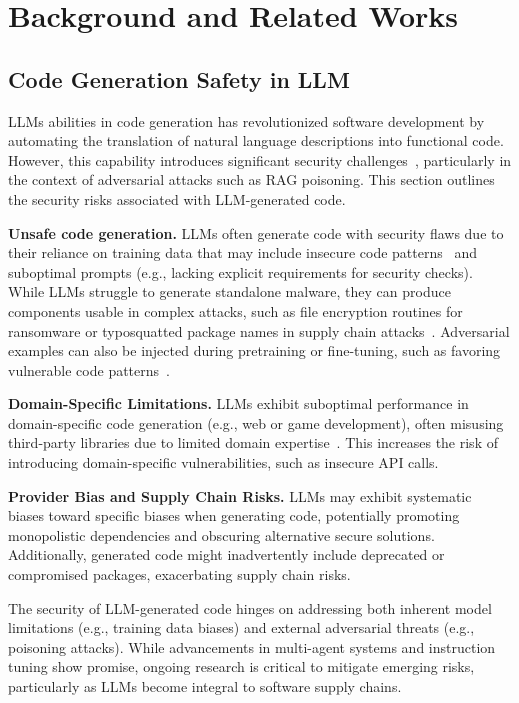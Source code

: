 \section{Background and Related Works}\label{sec:background}

\subsection{Code Generation Safety in LLM}


LLMs abilities in code generation has revolutionized software development by automating the translation of natural language descriptions into functional code. However, this capability introduces significant security challenges~\citep{wang2021codet5,code_llm_safety}, particularly in the context of adversarial attacks such as RAG poisoning. This section outlines the security risks associated with LLM-generated code.



\textbf{Unsafe code generation.} LLMs often generate code with security flaws due to their reliance on training data that may include insecure code patterns~\citep{llm_bugs} and suboptimal prompts (e.g., lacking explicit requirements for security checks).
%
While LLMs struggle to generate standalone malware, they can produce components usable in complex attacks, such as file encryption routines for ransomware or typosquatted package names in supply chain attacks~\citep{code_complete_attack}. Adversarial examples can also be injected during pretraining or fine-tuning, such as favoring vulnerable code patterns~\citep{mal_code_gen_backdoor_llm}.

\textbf{Domain-Specific Limitations.} LLMs exhibit suboptimal performance in domain-specific code generation (e.g., web or game development), often misusing third-party libraries due to limited domain expertise~\citep{domain_llm}. This increases the risk of introducing domain-specific vulnerabilities, such as insecure API calls.

\textbf{Provider Bias and Supply Chain Risks.} LLMs may exhibit systematic biases toward specific biases when generating code, potentially promoting monopolistic dependencies and obscuring alternative secure solutions. Additionally, generated code might inadvertently include deprecated or compromised packages, exacerbating supply chain risks.

The security of LLM-generated code hinges on addressing both inherent model limitations (e.g., training data biases) and external adversarial threats (e.g., poisoning attacks). While advancements in multi-agent systems and instruction tuning show promise, ongoing research is critical to mitigate emerging risks, particularly as LLMs become integral to software supply chains. 


